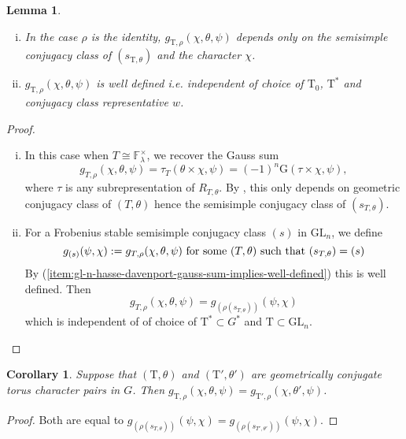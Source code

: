 \documentclass[12pt, reqno]{amsart}
\newtheorem{lemma}[theorem]{Lemma}
\newtheorem{corollary}[theorem]{Corollary}
\theoremstyle{definition}
\theoremstyle{definition}
\theoremstyle{definition}
\newcommand{\multiplicativegroup}[1]{#1^{\times}}
\newcommand{\fieldCharacter}{\psi}
\newcommand{\GL}{\mathrm{GL}}
\newcommand{\finiteField}{\mathbb{F}}
\newcommand{\finiteFieldExtension}[1]{\finiteField_{#1}}
\newcommand{\GaussSumScalar}[2]{\mathrm{G}\left(#1, #2\right)}
\newcommand{\GaussSumTorusCharacter}[4]{\tau_{#1}\left(#2 \times #3, #4\right)}
\newcommand{\algebraicGroup}[1]{\boldsymbol{\mathrm{#1}}}
\begin{document}
\begin{lemma}
\label{lemma:gl_invariance}
\begin{enumerate}[(i)]
	\item \label{item:gl-n-hasse-davenport-gauss-sum-implies-well-defined} In the case $\rho$ is the identity, $g_{\algebraicGroup{T},\rho}(\chi,\theta,\psi)$ depends only on the semisimple conjugacy class of $(s_{\algebraicGroup{T},\theta})$ and the character $\chi$.
	\item $g_{\algebraicGroup{T},\rho}(\chi,\theta,\psi)$ is well defined i.e. independent of choice of $\algebraicGroup{T}_0$, $\algebraicGroup{T}^*$ and conjugacy class representative $w$.
\end{enumerate}
\end{lemma}
\begin{proof}
\begin{enumerate}[(i)]
	\item In this case when $T \cong \multiplicativegroup{\finiteFieldExtension{\lambda}}$, we recover the Gauss sum
	\[
	g_{T,\rho}(\chi,\theta,\psi) = \GaussSumTorusCharacter{T}{\theta}{\chi}{\fieldCharacter} = \left(-1\right)^n \GaussSumScalar{\tau \times \chi}{\fieldCharacter},
	\]
	where $\tau$ is any subrepresentation of $R_{T,\theta}$. By , this only depends on geometric conjugacy class of $(T,\theta)$ hence the semisimple conjugacy class of $(s_{T,\theta})$.
	\item For a Frobenius stable semisimple conjugacy class $(s)$ in $\GL_n$, we define
	\[
	g_{(s)}(\psi,\chi) := g_{T,\rho}(\chi,\theta,\psi) \textnormal{ for some } (T,\theta) \textnormal{ such that } (s_{T,\theta}) = (s)
	\]
	By (\ref{item:gl-n-hasse-davenport-gauss-sum-implies-well-defined}) this is well defined. Then
	\[
	g_{T,\rho}(\chi,\theta,\psi)  = g_{(\rho(s_{T,\theta}))}(\psi,\chi)
	\]
	which is independent of of choice of $\algebraicGroup{T}^* \subset G^*$ and $\algebraicGroup{T} \subset \GL_n$.
\end{enumerate}
\end{proof}


\begin{corollary}
\label{cor:geoconj}
Suppose that $(\algebraicGroup{T},\theta)$ and $(\algebraicGroup{T}',\theta')$ are geometrically conjugate torus character pairs in $G$. Then $g_{\algebraicGroup{T},\rho}(\chi,\theta,\psi) = g_{\algebraicGroup{T}',\rho}(\chi,\theta',\psi)$.
\end{corollary}
\begin{proof}
Both are equal to $g_{(\rho(s_{T,\theta}))}(\psi,\chi) = g_{(\rho(s_{T',\theta'}))}(\psi,\chi)$.
\end{proof}
\end{document}
